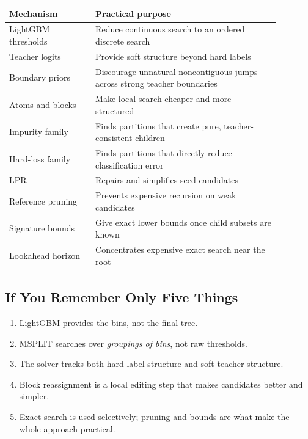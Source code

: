 \documentclass[11pt]{article}
\begin{document}
\begin{center}
\begin{tabular}{|p{0.28\linewidth}|p{0.6\linewidth}|}
\hline
\textbf{Mechanism} & \textbf{Practical purpose} \\
\hline
LightGBM thresholds & Reduce continuous search to an ordered discrete search \\
\hline
Teacher logits & Provide soft structure beyond hard labels \\
\hline
Boundary priors & Discourage unnatural noncontiguous jumps across strong teacher boundaries \\
\hline
Atoms and blocks & Make local search cheaper and more structured \\
\hline
Impurity family & Finds partitions that create pure, teacher-consistent children \\
\hline
Hard-loss family & Finds partitions that directly reduce classification error \\
\hline
LPR & Repairs and simplifies seed candidates \\
\hline
Reference pruning & Prevents expensive recursion on weak candidates \\
\hline
Signature bounds & Give exact lower bounds once child subsets are known \\
\hline
Lookahead horizon & Concentrates expensive exact search near the root \\
\hline
\end{tabular}
\end{center}

\subsection{If You Remember Only Five Things}

\begin{enumerate}
\item LightGBM provides the bins, not the final tree.
\item MSPLIT searches over \emph{groupings of bins}, not raw thresholds.
\item The solver tracks both hard label structure and soft teacher structure.
\item Block reassignment is a local editing step that makes candidates better and simpler.
\item Exact search is used selectively; pruning and bounds are what make the whole approach practical.
\end{enumerate}
\end{document}
